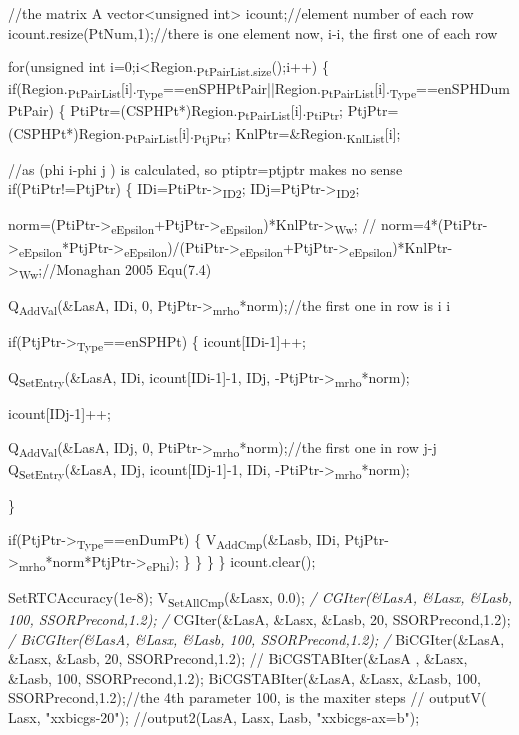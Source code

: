 \documentclass[presentation]{beamer}
\begin{document}
//the matrix A
vector<unsigned int> icount;//element number of each row
icount.resize(PtNum,1);//there is one element now, i-i, the first one of each row

for(unsigned int i=0;i<Region.\textsubscript{PtPairList.size}();i++)
  \{
    if(Region.\textsubscript{PtPairList}[i].\textsubscript{Type}==enSPHPtPair||Region.\textsubscript{PtPairList}[i].\textsubscript{Type}==enSPHDumPtPair)
  \{
        PtiPtr=(CSPHPt*)Region.\textsubscript{PtPairList}[i].\textsubscript{PtiPtr};
        PtjPtr=(CSPHPt*)Region.\textsubscript{PtPairList}[i].\textsubscript{PtjPtr};
        KnlPtr=\&Region.\textsubscript{KnlList}[i];

//as (phi i-phi j ) is calculated,  so ptiptr=ptjptr makes no sense
if(PtiPtr!=PtjPtr)
  \{
    IDi=PtiPtr->\textsubscript{ID2};
    IDj=PtjPtr->\textsubscript{ID2};

norm=(PtiPtr->\textsubscript{eEpsilon}+PtjPtr->\textsubscript{eEpsilon})*KnlPtr->\textsubscript{Ww};
// norm=4*(PtiPtr->\textsubscript{eEpsilon}*PtjPtr->\textsubscript{eEpsilon})/(PtiPtr->\textsubscript{eEpsilon}+PtjPtr->\textsubscript{eEpsilon})*KnlPtr->\textsubscript{Ww};//Monaghan 2005 Equ(7.4)

Q\textsubscript{AddVal}(\&LasA, IDi, 0, PtjPtr->\textsubscript{mrho}*norm);//the first one in row is i i

if(PtjPtr->\textsubscript{Type}==enSPHPt)
  \{
    icount[IDi-1]++;

Q\textsubscript{SetEntry}(\&LasA, IDi, icount[IDi-1]-1, IDj, -PtjPtr->\textsubscript{mrho}*norm);

icount[IDj-1]++;

Q\textsubscript{AddVal}(\&LasA, IDj, 0, PtiPtr->\textsubscript{mrho}*norm);//the first one in row j-j
Q\textsubscript{SetEntry}(\&LasA, IDj, icount[IDj-1]-1, IDi, -PtiPtr->\textsubscript{mrho}*norm);

\}

            if(PtjPtr->\textsubscript{Type}==enDumPt)
              \{
                V\textsubscript{AddCmp}(\&Lasb, IDi, PtjPtr->\textsubscript{mrho}*norm*PtjPtr->\textsubscript{ePhi});
              \}
          \}
      \}
  \}
icount.clear();

SetRTCAccuracy(1e-8);
V\textsubscript{SetAllCmp}(\&Lasx, 0.0);
\emph{/ CGIter(\&LasA, \&Lasx, \&Lasb, 100, SSORPrecond,1.2);
/} CGIter(\&LasA, \&Lasx, \&Lasb, 20, SSORPrecond,1.2);
\emph{/ BiCGIter(\&LasA, \&Lasx, \&Lasb, 100, SSORPrecond,1.2);
/} BiCGIter(\&LasA, \&Lasx, \&Lasb, 20, SSORPrecond,1.2);
// BiCGSTABIter(\&LasA , \&Lasx, \&Lasb, 100, SSORPrecond,1.2);
BiCGSTABIter(\&LasA, \&Lasx, \&Lasb, 100, SSORPrecond,1.2);//the 4th parameter 100, is the maxiter steps
// outputV( Lasx,  "xxbicgs-20");
//output2(LasA, Lasx, Lasb, "xxbicgs-ax=b");
\end{document}
